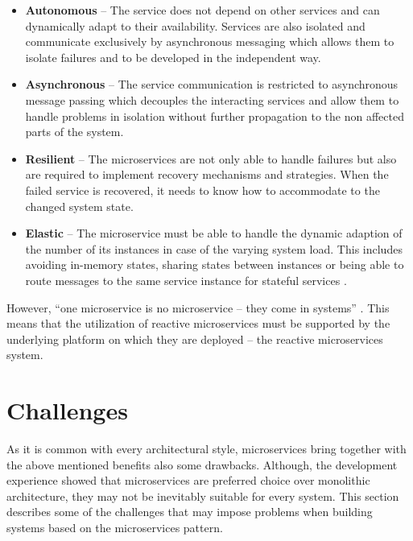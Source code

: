 \documentclass[oneside,
  digital, %
  table,   %
  lof,     %
  lot,     %
]{fithesis3}
\begin{document}
\begin{itemize}
    \item \textbf{Autonomous} -- The service does not depend on other services and can dynamically adapt to their availability. Services are also isolated and communicate exclusively by asynchronous messaging which allows them to isolate failures and to be developed in the independent way.
    
    \item \textbf{Asynchronous} -- The service communication is restricted to asynchronous message passing which decouples the interacting services and allow them to handle problems in isolation without further propagation to the non affected parts of the system.
    
    \item \textbf{Resilient} -- The microservices are not only able to handle failures but also are required to implement recovery mechanisms and strategies. When the failed service is recovered, it needs to know how to accommodate to the changed system state.
    
    \item \textbf{Elastic} -- The microservice must be able to handle the dynamic adaption of the number of its instances in case of the varying system load. This includes avoiding in-memory states, sharing states between instances or being able to route messages to the same service instance for stateful services \cite{building_reactive_ms_in_java}. 
\end{itemize}

However, \enquote{one microservice is no microservice -- they come in systems} \cite{reactive_ms_arch}. This means that the utilization of reactive microservices must be supported by the underlying platform on which they are deployed -- the reactive microservices system.

\section{Challenges}

As it is common with every architectural style, microservices bring together with the above mentioned benefits also some drawbacks. Although, the development experience showed that microservices are preferred choice over monolithic architecture, they may not be inevitably suitable for every system. This section describes some of the challenges that may impose problems when building systems based on the microservices pattern.
\end{document}
